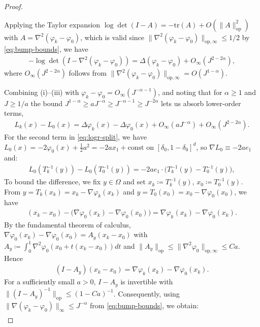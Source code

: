 \documentclass[11pt,reqno]{amsart}
\theoremstyle{definition}
\begin{document}
\begin{proof}
\begin{enumerate}
Applying the Taylor expansion $\log\det(I-A)=-\mathrm{tr}(A)+O(\|A\|_{\mathrm{op}}^2)$ with $A=\nabla^2(\varphi_k-\varphi_0)$, which is valid since $\|\nabla^2(\varphi_k-\varphi_0)\|_{\mathrm{op},\infty}\le 1/2$ by \eqref{eq:bump-bounds}, we have
\begin{align}
    -\log\det(I-\nabla^2(\varphi_k-\varphi_0))  =  \Delta(\varphi_k-\varphi_0) + O_\infty(J^{2-2\alpha}),
\end{align}
where $O_\infty(J^{2-2\alpha})$ follows from $\|\nabla^2(\varphi_k-\varphi_0)\|_{\mathrm{op},\infty}=O(J^{1-\alpha})$.
\end{enumerate}
Combining (i)--(iii) with $\varphi_k-\varphi_0=O_\infty(J^{-\alpha-1})$, and noting that for $\alpha\ge 1$ and $J\ge 1/a$ the bound $J^{1-\alpha}\ge a J^{-\alpha}\ge J^{-\alpha-1}\ge J^{-2\alpha}$ lets us absorb lower-order terms,
\begin{align}
    \label{eq:deltaL-expand}
    L_k(x)-L_0(x)  =  \Delta \varphi_k(x)-\Delta \varphi_0(x)+O_\infty(a J^{-\alpha})+O_\infty(J^{2-2\alpha}).
\end{align}
For the second term in \eqref{eq:logr-split}, we have $L_0(x)=-2\varphi_0(x)+\frac1{2}a^2=-2ax_1+\mathrm{const}$ on $[\delta_0, 1-\delta_0]^d$, so $\nabla L_0\equiv-2ae_1$ and:
\begin{align}\label{eq:L0-expand}
    L_0(T_k^{-1}(y))-L_0(T_0^{-1}(y))  =  -2a e_1 \cdot \bigl(T_k^{-1}(y)-T_0^{-1}(y)\bigr),
\end{align}
To bound the difference, we fix $y\in\Omega$ and set $x_k\coloneqq T_k^{-1}(y)$, $x_0\coloneqq T_0^{-1}(y)$. From $y=T_k(x_k)=x_k-\nabla \varphi_k(x_k)$ and $y=T_0(x_0)=x_0-\nabla \varphi_0(x_0)$, we have
\begin{align}
    (x_k-x_0)  -  \bigl(\nabla \varphi_0(x_k)-\nabla \varphi_0(x_0)\bigr)
     =  \nabla \varphi_k(x_k)-\nabla \varphi_0(x_k).
\end{align}
By the fundamental theorem of calculus, $\nabla \varphi_0(x_k)-\nabla \varphi_0(x_0)=A_y(x_k-x_0)$ with $A_y\coloneqq\int_0^1 \nabla^2 \varphi_0(x_0+t(x_k-x_0)) dt$ and $\|A_y\|_{\mathrm{op}}\le\|\nabla^2 \varphi_0\|_{\mathrm{op},\infty}\le Ca$. Hence
\begin{align}
    (I-A_y)(x_k-x_0) = \nabla \varphi_k(x_k)-\nabla \varphi_0(x_k).
\end{align}
For a sufficiently small $a>0$, $I-A_y$ is invertible with $\|(I-A_y)^{-1}\|_{\mathrm{op}}\le(1-Ca)^{-1}$. Consequently, using $\|\nabla(\varphi_k-\varphi_0)\|_\infty\le J^{-\alpha}$ from \eqref{eq:bump-bounds}, we obtain:
\begin{align}\label{eq:T-inv-diff}

\end{align}
\end{proof}
\end{document}
